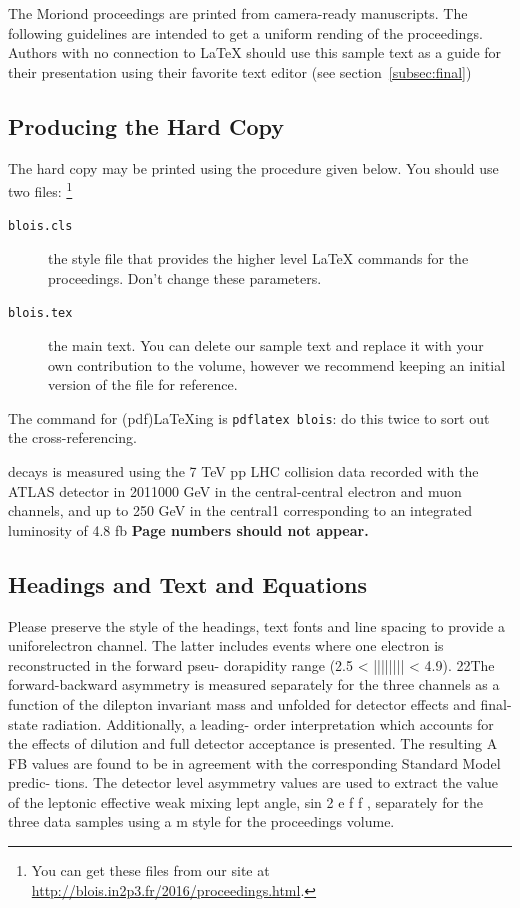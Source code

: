 \documentclass{blois}
\begin{document}
The Moriond proceedings are printed from camera-ready manuscripts.
The following guidelines are intended to get a uniform rending of the 
proceedings. Authors with no connection to \LaTeX{} should use this
sample text as a guide for their presentation using their favorite
text editor (see section~\ref{subsec:final})

\subsection{Producing the Hard Copy}\label{subsec:prod}

The hard copy may be printed using the procedure given below.
You should use
two files: \footnote{You can get these files from
our site at \url{http://blois.in2p3.fr/2016/proceedings.html}.}
\begin{description}
\item[\texttt{blois.cls}] the style file that provides the higher
level \LaTeX{} commands for the proceedings. Don't change these parameters.
\item[\texttt{blois.tex}] the main text. You can delete our sample
text and replace it with your own contribution to the volume, however we
recommend keeping an initial version of the file for reference.
\end{description}
The command for (pdf)\LaTeX ing is \texttt{pdflatex blois}: do this twice to
sort out the cross-referencing.

 decays is measured using the
7 TeV pp LHC collision data recorded with the ATLAS detector in 2011000 GeV in the central-central electron and muon channels, and up to 250 GeV in the central1 corresponding to an integrated
luminosity of 4.8 fb {\bf Page numbers should not appear.}

\subsection{Headings and Text and Equations}

Please preserve the style of the
headings, text fonts and line spacing to provide a
uniforelectron channel. The latter includes events where one electron is reconstructed in the forward pseu-
dorapidity range (2.5 < |||||||| < 4.9).
22The forward-backward asymmetry is measured separately for the three channels as a function of the
dilepton invariant mass and unfolded for detector effects and final-state radiation. Additionally, a leading-
order interpretation which accounts for the effects of dilution and full detector acceptance is presented.
The resulting A FB values are found to be in agreement with the corresponding Standard Model predic-
tions.
The detector level asymmetry values are used to extract the value of the leptonic effective weak mixing
lept
angle, sin 2         e f f , separately for the three data samples using a m style for the proceedings volume.
\end{document}
